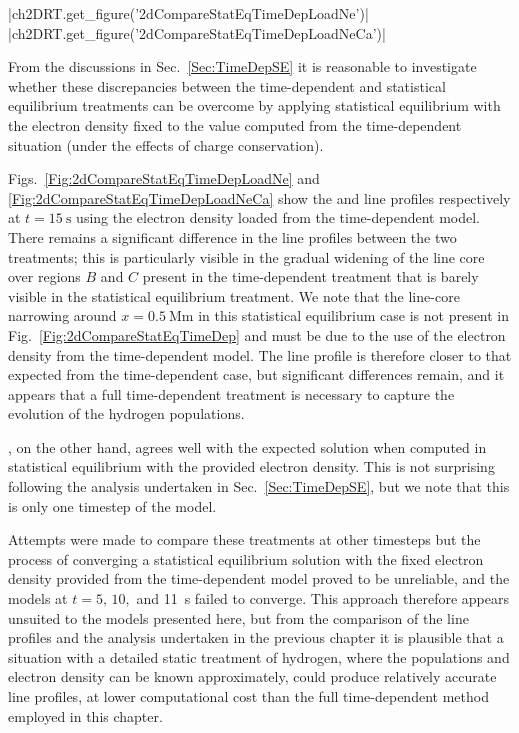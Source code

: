 \py[2DRT]|ch2DRT.get_figure('2dCompareStatEqTimeDepLoadNe')|
\py[2DRT]|ch2DRT.get_figure('2dCompareStatEqTimeDepLoadNeCa')|

From the discussions in Sec.~\ref{Sec:TimeDepSE} it is reasonable to investigate whether these discrepancies between the time-dependent and statistical equilibrium treatments can be overcome by applying statistical equilibrium with the electron density fixed to the value computed from the time-dependent situation (under the effects of charge conservation).

Figs.~\ref{Fig:2dCompareStatEqTimeDepLoadNe} and \ref{Fig:2dCompareStatEqTimeDepLoadNeCa} show the \Ha{} and \CaLine{} line profiles respectively at $t=\SI{15}{\second}$ using the electron density loaded from the time-dependent model.
There remains a significant difference in the \Ha{} line profiles between the two treatments; this is particularly visible in the gradual widening of the line core over regions $B$ and $C$ present in the time-dependent treatment that is barely visible in the statistical equilibrium treatment.
We note that the line-core narrowing around $x=\SI{0.5}{\mega\metre}$ in this statistical equilibrium case is not present in Fig.~\ref{Fig:2dCompareStatEqTimeDep} and must be due to the use of the electron density from the time-dependent model.
The \Ha{} line profile is therefore closer to that expected from the time-dependent case, but significant differences remain, and it appears that a full time-dependent treatment is necessary to capture the evolution of the hydrogen populations.

\CaLine{}, on the other hand, agrees well with the expected solution when computed in statistical equilibrium with the provided electron density.
This is not surprising following the analysis undertaken in Sec.~\ref{Sec:TimeDepSE}, but we note that this is only one timestep of the model.

Attempts were made to compare these treatments at other timesteps but the process of converging a statistical equilibrium solution with the fixed electron density provided from the time-dependent model proved to be unreliable, and the models at $t=5,\,10,$ and \SI{11}{\second} failed to converge.
This approach therefore appears unsuited to the models presented here, but from the comparison of the \CaLine{} line profiles and the analysis undertaken in the previous chapter it is plausible that a situation with a detailed static treatment of hydrogen, where the populations and electron density can be known approximately, could produce relatively accurate \CaLine{} line profiles, at lower computational cost than the full time-dependent method employed in this chapter.

